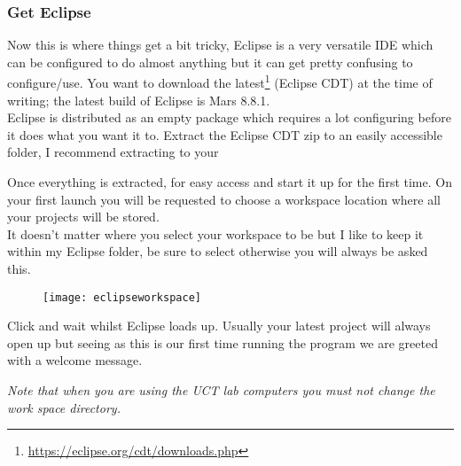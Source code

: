 {{\subsubsection{Get Eclipse}
Now this is where things get a bit tricky, Eclipse is a very versatile IDE which can be configured to do almost anything but it can get pretty confusing to configure/use.
You want to download the latest\href{http://https://eclipse.org/cdt/downloads.php}{\color{Blue}\underline{}}\hspace{1pt}\footnote{\url{https://eclipse.org/cdt/downloads.php}} (Eclipse CDT) at the time of writing; the latest build of Eclipse is Mars 8.8.1.\\
Eclipse is distributed as an empty package which requires a lot configuring before it does what you want it to. Extract the Eclipse CDT zip to an easily accessible folder, I recommend extracting to your 
\par
{}
\newpage
\parindent=0pt
Once everything is extracted, \underline{} for easy access and start it up for the first time. On your first launch you will be requested to choose a workspace location where all your projects will be stored. 
\\
\justifying
It doesn't matter where you select your workspace to be but I like to keep it within my Eclipse folder, be sure to select  otherwise you will always be asked this.
\begin{figure}[htbp]
\centering
\texttt{[image: eclipseworkspace]}
\end{figure}
\justifying
\parindent=0pt
\par
Click  and wait whilst Eclipse loads up. Usually your latest project will always open up but seeing as this is our first time running the program we are greeted with a welcome message.
\par
\emph{\color{Gray} Note that when you are using the UCT lab computers you must not change the work space directory.}
\par
}}

